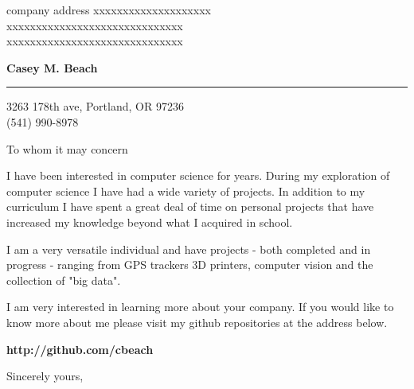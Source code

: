 \documentclass{letter} %
\begin{document}
\signature{Casey M. Beach}           %
\longindentation=0pt                       %
\let\raggedleft\raggedright                %
 
 
\begin{letter}{company address xxxxxxxxxxxxxxxxxxxx \\
xxxxxxxxxxxxxxxxxxxxxxxxxxxxxx \\
xxxxxxxxxxxxxxxxxxxxxxxxxxxxxx }

\begin{flushleft}
{\large\bf Casey M. Beach}
\end{flushleft}
\medskip\hrule height 1pt
\begin{flushright}
\hfill 3263 178th ave, Portland, OR 97236 \\
\hfill (541) 990-8978 
\end{flushright} 
\vfill %

 
\opening{To whom it may concern} 
\begin{flushleft} 

\noindent I have been interested in computer science for years.  During my exploration of computer science
I have had a wide variety of projects.  In addition to my curriculum I have spent a great deal of time
on personal projects that have increased my knowledge beyond what I acquired in school.

I am a very versatile individual and have projects - both completed and in progress - ranging from GPS trackers
3D printers, computer vision and the collection of "big data".

I am very interested in learning more about your company.  If you would like to know more about me please visit my github
repositories at the address below. \\ 
\end{flushleft}
\begin{center}
	\textbf{http://github.com/cbeach}
\end{center}


\closing{Sincerely yours,} 
 

 

\end{letter}
 
\end{document}
